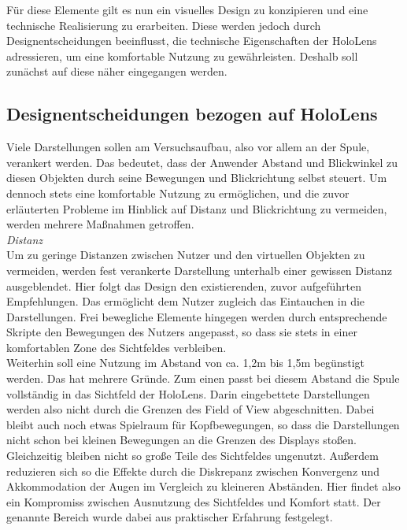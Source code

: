 Für diese Elemente gilt es nun ein visuelles Design zu konzipieren und eine technische Realisierung zu erarbeiten. Diese werden jedoch durch Designentscheidungen beeinflusst, die technische Eigenschaften der HoloLens adressieren, um eine komfortable Nutzung zu gewährleisten. Deshalb soll zunächst auf diese näher eingegangen werden.

\subsection{Designentscheidungen bezogen auf HoloLens}
\label{sec-4-2}
Viele Darstellungen sollen am Versuchsaufbau, also vor allem an der Spule, verankert werden. Das bedeutet, dass der Anwender Abstand und Blickwinkel zu diesen Objekten durch seine Bewegungen und Blickrichtung selbst steuert. Um dennoch stets eine komfortable Nutzung zu ermöglichen, und die zuvor erläuterten Probleme im Hinblick auf Distanz und Blickrichtung zu vermeiden, werden mehrere Maßnahmen getroffen.\\

\textit{Distanz}\\
Um zu geringe Distanzen zwischen Nutzer und den virtuellen Objekten zu vermeiden, werden fest verankerte Darstellung unterhalb einer gewissen Distanz ausgeblendet. Hier folgt das Design den existierenden, zuvor aufgeführten Empfehlungen. Das ermöglicht dem Nutzer zugleich das Eintauchen in die Darstellungen. Frei bewegliche Elemente hingegen werden durch entsprechende Skripte den Bewegungen des Nutzers angepasst, so dass sie stets in einer komfortablen Zone des Sichtfeldes verbleiben.\\

Weiterhin soll eine Nutzung im Abstand von ca. 1,2m bis 1,5m begünstigt werden. Das hat mehrere Gründe. Zum einen passt bei diesem Abstand die Spule vollständig in das Sichtfeld der HoloLens. Darin eingebettete Darstellungen werden also nicht durch die Grenzen des Field of View abgeschnitten. Dabei bleibt auch noch etwas Spielraum für Kopfbewegungen, so dass die Darstellungen nicht schon bei kleinen Bewegungen an die Grenzen des Displays stoßen. Gleichzeitig bleiben nicht so große Teile des Sichtfeldes ungenutzt. Außerdem reduzieren sich so die Effekte durch die Diskrepanz zwischen Konvergenz und Akkommodation der Augen im Vergleich zu kleineren Abständen. Hier findet also ein Kompromiss zwischen Ausnutzung des Sichtfeldes und Komfort statt. Der genannte Bereich wurde dabei aus praktischer Erfahrung festgelegt.\\

